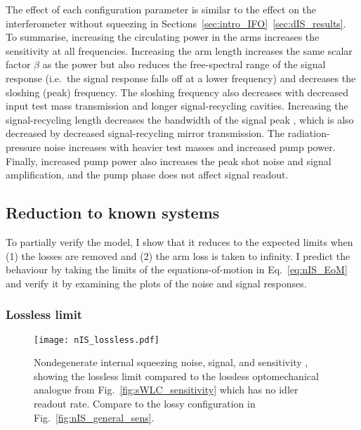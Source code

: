 The effect of each configuration parameter is similar to the effect on the interferometer without squeezing in Sections~\ref{sec:intro_IFO}~\ref{sec:dIS_results}. To summarise, increasing the circulating power in the arms increases the sensitivity at all frequencies. Increasing the arm length increases the same scalar factor $\beta$ as the power but also reduces the free-spectral range of the signal response (i.e.\ the signal response falls off at a lower frequency) and decreases the sloshing (peak) frequency. The sloshing frequency also decreases with decreased input test mass transmission and longer signal-recycling cavities. Increasing the signal-recycling length decreases the bandwidth of the signal peak , which is also decreased by decreased signal-recycling mirror transmission. The radiation-pressure noise increases with heavier test masses and increased pump power. Finally, increased pump power also increases the peak shot noise and signal amplification, and the pump phase does not affect signal readout. 


\subsection{Reduction to known systems}

To partially verify the model, I show that it reduces to the expected limits when (1) the losses are removed and (2) the arm loss is taken to infinity. I predict the behaviour by taking the limits of the equations-of-motion in Eq.~\ref{eq:nIS_EoM} and verify it by examining the plots of the noise and signal responses.

\subsubsection{Lossless limit}

\begin{figure}
	\centering
	\texttt{[image: nIS\_lossless.pdf]}
	\caption{  Nondegenerate internal squeezing noise, signal, and sensitivity , showing the lossless limit compared to the lossless optomechanical analogue from Fig.~\ref{fig:sWLC_sensitivity} which has no idler readout rate.  Compare to the lossy configuration in Fig.~\ref{fig:nIS_general_sens}.}
	\label{fig:nIS_lossless}
\end{figure}

